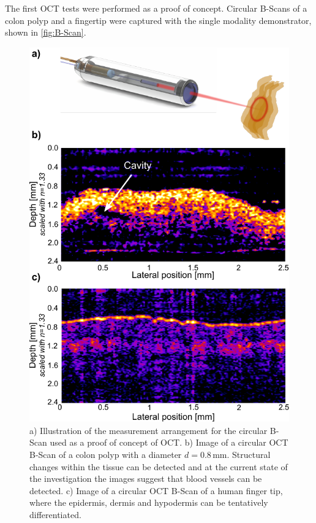 \documentclass[10pt]{iopart}
\begin{document}
The first OCT tests were performed as a proof of concept. Circular B-Scans of a colon polyp and a fingertip were captured with the single modality demonstrator, shown in \autoref{fig:B-Scan}. 
\begin{figure}[h!]\centering \includegraphics[width=\columnwidth]{figures/OCT_Measurement_arrangement}
      \caption{a) Illustration of the measurement arrangement for the circular B-Scan used as a proof of concept of OCT. b) Image of a circular OCT B-Scan of a colon polyp with a diameter $d=0.8\,\text{mm}$. Structural changes within the tissue can be detected and at the current state of the investigation the images suggest that blood vessels can be detected.
      c) Image of a circular OCT B-Scan of a human finger tip, where the epidermis, dermis and hypodermis can be tentatively differentiated.}
      \label{fig:B-Scan}
\end{figure}
\end{document}
